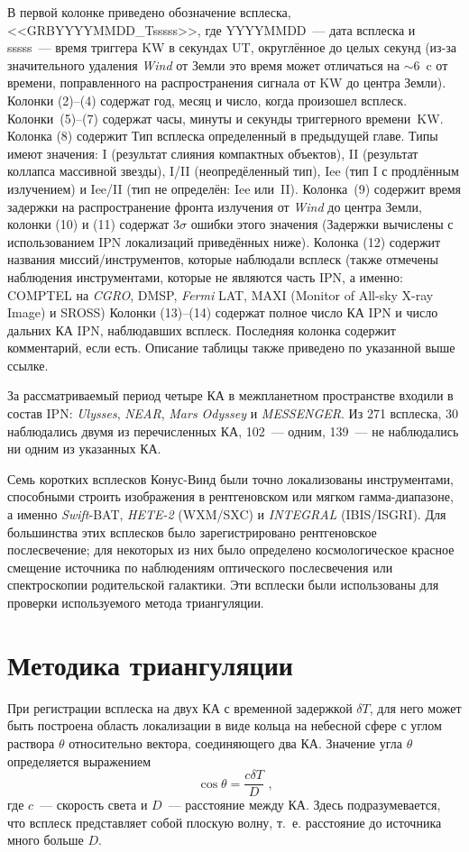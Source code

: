 В первой колонке приведено обозначение всплеска, <<GRBYYYYMMDD\_Tsssss>>, 
где YYYYMMDD~--- дата всплеска и sssss~--- время триггера KW в секундах UT,
округлённое до целых секунд (из-за значительного удаления \textit{Wind} от Земли
это время может отличаться на $\sim 6$~c от времени, поправленного на распространения 
сигнала от KW до центра Земли). 
Колонки (2)--(4) содержат год, месяц и число, когда произошел всплеск. 
Колонки~(5)--(7) содержат часы, минуты и секунды триггерного времени~KW.
Колонка (8) содержит Тип всплеска определенный в предыдущей главе. 
Типы имеют значения: I (результат слияния компактных объектов), 
II (результат коллапса массивной звезды), I/II (неопредёленный тип), Iee (тип I с продлённым излучением)
и Iee/II (тип не определён: Iee или~II). Колонка~(9) содержит время задержки на распространение
фронта излучения от  \textit{Wind} до центра Земли, колонки (10) и (11) содержат
$3\sigma$ ошибки этого значения (Задержки вычислены с использованием IPN локализаций приведённых ниже). 
Колонка (12) содержит названия миссий/инструментов, которые наблюдали всплеск
(также отмечены наблюдения инструментами, которые не являются часть IPN, а именно:
COMPTEL на \textit{CGRO}, DMSP, \textit{Fermi} LAT, MAXI (Monitor of All-sky X-ray Image) и SROSS)
Колонки (13)--(14) содержат полное число КА IPN и число дальних КА IPN, наблюдавших всплеск.
Последняя колонка содержит комментарий, если есть. Описание таблицы также приведено по указанной выше ссылке.

За рассматриваемый период четыре КА в межпланетном пространстве входили в состав IPN: 
\textit{Ulysses}, \textit{NEAR}, \textit{Mars Odyssey} и \textit{MESSENGER}. 
Из 271 всплеска, 30 наблюдались двумя из перечисленных КА, 102~--- одним, 
139~--- не наблюдались ни одним из указанных КА.

Семь коротких всплесков Конус-Винд были точно локализованы инструментами, 
способными строить изображения в рентгеновском или мягком гамма-диапазоне, 
а именно \textit{Swift}-BAT, \textit{HETE-2} (WXM/SXC) и \textit{INTEGRAL} (IBIS/ISGRI). 
Для большинства этих всплесков было зарегистрировано рентгеновское послесвечение; 
для некоторых из них было определено космологическое красное смещение источника 
по наблюдениям оптического послесвечения или спектроскопии родительской галактики. 
Эти всплески были использованы для проверки используемого метода триангуляции.
\FloatBarrier
\section{Методика триангуляции}
При регистрации всплеска на двух КА с временной задержкой $\delta T$, для него 
может быть построена область локализации в виде кольца на небесной сфере с углом 
раствора $\theta$ относительно вектора, соединяющего два КА. Значение угла $\theta$ определяется выражением
\begin{equation}
\cos \theta = \frac{c \delta T}{D} \mbox{ ,}
\end{equation}
где $c$~--- скорость света и $D$~--- расстояние между КА. Здесь подразумевается, 
что всплеск представляет собой плоскую волну, т.~е. расстояние до источника много больше $D$.

